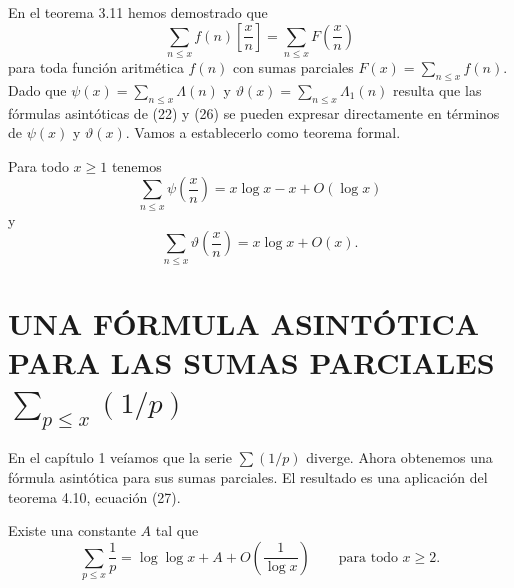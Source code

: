 \documentclass[12pt,a4paper]{book}
\begin{document}
    En el teorema 3.11 hemos demostrado que
    \begin{equation*}
        \sum_{n\leq x}f(n)\left[\frac{x}{n}\right]=\sum_{n\leq x}F\left(\frac{x}{n}\right)
    \end{equation*}
    para toda función aritmética $f(n)$ con sumas parciales $F(x)=\sum_{n\leq x}f(n)$.
    Dado que $\psi(x)=\sum_{n\leq x}\Lambda(n)$ y $\vartheta(x)=\sum_{n\leq x}\Lambda_1(n)$
    resulta que las fórmulas asintóticas de (22) y (26) se pueden expresar directamente
    en términos de $\psi(x)$ y $\vartheta(x)$. Vamos a establecerlo como teorema formal.

    \begin{teorema}
        Para todo $x\geq1$ tenemos
        \begin{equation}
            \sum_{n\leq x}\psi\left(\frac{x}{n}\right)=x\log x-x+O(\log x)
        \end{equation}
        y
        \begin{equation*}
            \sum_{n\leq x}\vartheta\left(\frac{x}{n}\right)=x\log x+O(x).
        \end{equation*}
    \end{teorema}

    \section[UNA FÓRMULA ASINTÓTICA PARA \texorpdfstring{$\sum(1/p)$}{∑(1/p)}]{UNA FÓRMULA ASINTÓTICA PARA LAS SUMAS PARCIALES $\sum_{p\leq x}(1/p)$}

    En el capítulo 1 veíamos que la serie $\sum(1/p)$ diverge. Ahora obtenemos una
    fórmula asintótica para sus sumas parciales. El resultado es una aplicación del
    teorema 4.10, ecuación (27).

    \begin{teorema}
        Existe una constante $A$ tal que
        \begin{equation}
            \sum_{p\leq x}\frac{1}{p}=\log\log x+A+O\left(\frac{1}{\log x}\right)\qquad
            \text{para todo } x\geq2.
        \end{equation}
    \end{teorema}
\end{document}
